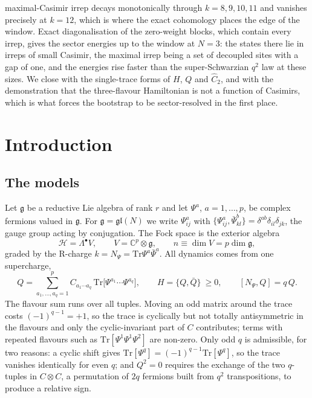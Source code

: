 \documentclass[10pt]{article}
\newcommand{\Tr}{\mathrm{Tr}}
\newcommand{\gl}{\mathfrak{gl}}
\newcommand{\g}{\mathfrak{g}}
\newcommand{\bPsi}{\bar\Psi}
\newcommand{\bQ}{\bar Q}
\begin{document}
\begin{center}
\begin{minipage}{0.95\textwidth}
maximal-Casimir irrep decays monotonically through $k=8,9,10,11$ and vanishes precisely at $k=12$, which is
where the exact cohomology places the edge of the window. Exact diagonalisation of the zero-weight blocks,
which contain every irrep, gives the sector energies up to the window at $N=3$: the states there lie in irreps
of small Casimir, the maximal irrep being a set of decoupled sites with a gap of one, and the energies rise faster
than the super-Schwarzian $q^2$ law at these sizes. We close with the single-trace forms of $H$, $Q$ and
$\hat C_2$, and with the demonstration that the three-flavour Hamiltonian is not a function of Casimirs, which
is what forces the bootstrap to be sector-resolved in the first place.
\end{minipage}\end{center}
\vspace{8pt}

\section{Introduction}\label{sec:intro}

\subsection{The models}

Let $\g$ be a reductive Lie algebra of rank $r$ and let $\Psi^a$, $a=1,\dots,p$, be complex fermions valued in
$\g$. For $\g=\gl(N)$ we write $\Psi^a_{ij}$ with
$\{\Psi^a_{ij},\bPsi^b_{kl}\}=\delta^{ab}\delta_{il}\delta_{jk}$, the gauge group acting by conjugation. The
Fock space is the exterior algebra
\begin{equation}
\mathcal H=\Lambda^\bullet V,\qquad V=\mathbb C^p\otimes\g,\qquad n\equiv\dim V=p\dim\g,
\end{equation}
graded by the R-charge $k=N_\Psi=\Tr\Psi^a\bPsi^a$. All dynamics comes from one supercharge,
\begin{equation}
Q=\sum_{a_1,\dots,a_q=1}^{p}C_{a_1\cdots a_q}\,\Tr\!\big[\Psi^{a_1}\cdots\Psi^{a_q}\big],\qquad
H=\{Q,\bQ\}\ \ge0,\qquad [N_\Psi,Q]=q\,Q .
\label{eq:Q}
\end{equation}
The flavour sum runs over all tuples. Moving an odd matrix around the trace costs $(-1)^{q-1}=+1$, so the trace
is cyclically but not totally antisymmetric in the flavours and only the cyclic-invariant part of $C$
contributes; terms with repeated flavours such as $\Tr[\Psi^1\Psi^1\Psi^2]$ are non-zero. Only odd $q$ is
admissible, for two reasons: a cyclic shift gives $\Tr[\Psi^q]=(-1)^{q-1}\Tr[\Psi^q]$, so the trace vanishes
identically for even $q$; and $Q^2=0$ requires the exchange of the two $q$-tuples in $C\otimes C$, a permutation
of $2q$ fermions built from $q^2$ transpositions, to produce a relative sign.
\end{document}
